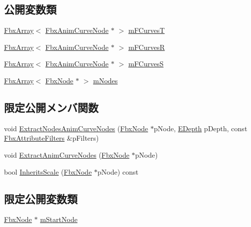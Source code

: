 \subsection*{公開変数類}
\begin{DoxyCompactItemize}
\item 
\hyperlink{class_fbx_array}{Fbx\+Array}$<$ \hyperlink{class_fbx_anim_curve_node}{Fbx\+Anim\+Curve\+Node} $\ast$ $>$ \hyperlink{class_fbx_objects_container_afc9a94566abf02db4959f4d2e4ec30a4}{m\+F\+CurvesT}
\item 
\hyperlink{class_fbx_array}{Fbx\+Array}$<$ \hyperlink{class_fbx_anim_curve_node}{Fbx\+Anim\+Curve\+Node} $\ast$ $>$ \hyperlink{class_fbx_objects_container_ac8fd85a4ea028cfcd8012f4c0e3c215b}{m\+F\+CurvesR}
\item 
\hyperlink{class_fbx_array}{Fbx\+Array}$<$ \hyperlink{class_fbx_anim_curve_node}{Fbx\+Anim\+Curve\+Node} $\ast$ $>$ \hyperlink{class_fbx_objects_container_a97e083e6505a8ba39f596c8a3d708734}{m\+F\+CurvesS}
\item 
\hyperlink{class_fbx_array}{Fbx\+Array}$<$ \hyperlink{class_fbx_node}{Fbx\+Node} $\ast$ $>$ \hyperlink{class_fbx_objects_container_a8d0ede6ba6ec874eb841593af719f063}{m\+Nodes}
\end{DoxyCompactItemize}
\subsection*{限定公開メンバ関数}
\begin{DoxyCompactItemize}
\item 
void \hyperlink{class_fbx_objects_container_aee1c40996023d5bc366599a64e609ccc}{Extract\+Nodes\+Anim\+Curve\+Nodes} (\hyperlink{class_fbx_node}{Fbx\+Node} $\ast$p\+Node, \hyperlink{class_fbx_objects_container_a70f47fef529be83cb1b45c0e067d73e5}{E\+Depth} p\+Depth, const \hyperlink{fbxobjectscontainer_8h_a74af631b21bcb9d44e73d3293bf785df}{Fbx\+Attribute\+Filters} \&p\+Filters)
\item 
void \hyperlink{class_fbx_objects_container_a649c2ed49d0c9f7b06cd241ab1a35686}{Extract\+Anim\+Curve\+Nodes} (\hyperlink{class_fbx_node}{Fbx\+Node} $\ast$p\+Node)
\item 
bool \hyperlink{class_fbx_objects_container_aede371a48bdbbdf4095ea95fe314ebb8}{Inherits\+Scale} (\hyperlink{class_fbx_node}{Fbx\+Node} $\ast$p\+Node) const
\end{DoxyCompactItemize}
\subsection*{限定公開変数類}
\begin{DoxyCompactItemize}
\item 
\hyperlink{class_fbx_node}{Fbx\+Node} $\ast$ \hyperlink{class_fbx_objects_container_a650407ad105a3029d29ac5b68e94b062}{m\+Start\+Node}
\end{DoxyCompactItemize}


